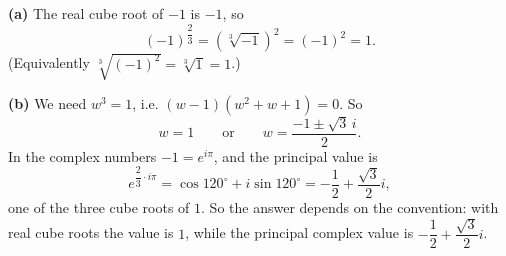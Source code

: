 \textbf{(a)} The real cube root of $-1$ is $-1$, so
\[(-1)^{\dfrac23}=\left(\sqrt[3]{-1}\right)^2=(-1)^2=\boxed{1}.\]
(Equivalently $\sqrt[3]{(-1)^2}=\sqrt[3]{1}=1$.)

\textbf{(b)} We need $w^3=1$, i.e. $(w-1)\left(w^2+w+1\right)=0$. So
\[w=1\qquad\text{or}\qquad w=\dfrac{-1\pm\sqrt3\,i}{2}.\]
In the complex numbers $-1=e^{i\pi}$, and the principal value is
\[e^{\dfrac23\cdot i\pi}=\cos120^\circ+i\sin120^\circ=\boxed{-\dfrac12+\dfrac{\sqrt3}{2}i},\]
one of the three cube roots of $1$. So the answer depends on the convention: with real cube roots the value is $1$, while the principal complex value is $-\dfrac12+\dfrac{\sqrt3}{2}i$.

